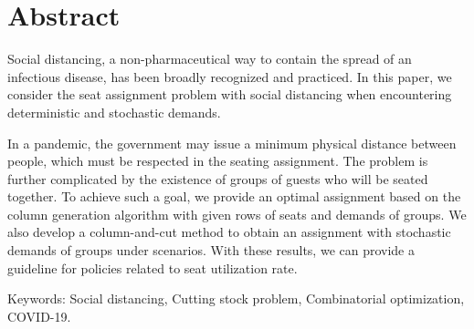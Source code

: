 
\section*{Abstract}
Social distancing, a non-pharmaceutical way to contain the spread of an infectious disease, has been broadly recognized and practiced. In this paper, we consider the 
seat assignment problem with social distancing when encountering deterministic and stochastic demands.

In a pandemic, the government may issue a minimum physical distance between people, which must be respected in the seating assignment. The problem is further complicated by the existence of groups of guests who will be seated together. To achieve such a goal, we provide an optimal assignment based on the column generation algorithm with given rows of seats and demands of groups. We also develop a column-and-cut method to obtain an assignment with stochastic demands of groups under scenarios. With these results, we can provide a guideline for policies related to seat utilization rate.

Keywords: Social distancing, Cutting stock problem, Combinatorial optimization, COVID-19.
